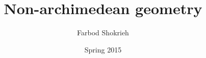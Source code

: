 \documentclass[oneside]{book}
\title{Non-archimedean geometry}
\author{Farbod Shokrieh}
\date{Spring 2015}
\begin{document}

\begin{titlepage}
\maketitle
\thispagestyle{empty}
\end{titlepage}


\frontmatter
\tableofcontents
\mainmatter










\end{document}
